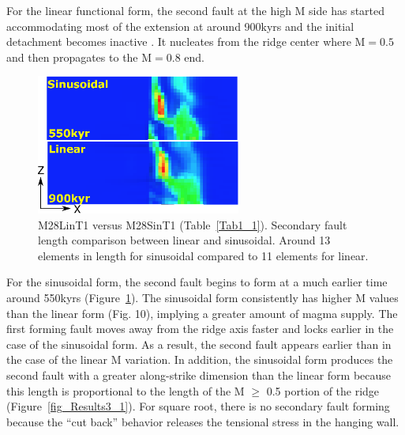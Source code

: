 For the linear functional form, the second fault  at the high M side has started accommodating most of the extension at around 900kyrs and the initial detachment becomes inactive . It nucleates from the ridge center where M$=0.5$ and then propagates to the M$=0.8$ end. %

\begin{figure}[h]
  \centering
    \includegraphics[width=0.6\textwidth]{./Figures/fig_Results4_2_secondary_fault_length_comparison.eps}
  \caption{M28LinT1 versus M28SinT1 (Table~\hyperref[Tab1_1]{\ref{Tab1_1}}). Secondary fault length comparison between linear and sinusoidal. Around 13 elements in length for sinusoidal compared to 11 elements for linear.}
 \label{fig_Results4_2}
\end{figure}   

For the sinusoidal form, the second fault begins to form at a much earlier time around 550kyrs (Figure~\hyperref[fig_Results4_2]{\ref{fig_Results4_2}}). The sinusoidal form consistently has higher M values than the linear form (Fig. 10), implying a greater amount of magma supply. %
The first forming fault moves away from the ridge axis faster and locks earlier in the case of the sinusoidal form. As a result, the second fault appears earlier than in the case of the linear M variation. In addition, the sinusoidal form produces the second fault with a greater along-strike dimension than the linear form because this length is proportional to the length of the M $\ge$ 0.5 portion of the ridge (Figure~\hyperref[fig_Results3_1]{\ref{fig_Results3_1}}). 
For square root, there is no secondary fault forming because the ``cut back'' behavior releases the tensional stress in the hanging wall.


